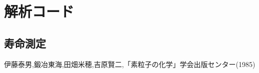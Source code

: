 \documentclass[dvipdfmx]{jsarticle}
\begin{document}
\section{解析コード}

\subsection{寿命測定}

\begin{mylisting}[language=c++]
\end{mylisting}

\begin{thebibliography}{10}
     伊藤泰男,鍛冶東海,田畑米穂,吉原賢二,「素粒子の化学」学会出版センター(1985)
\end{thebibliography}
\end{document}
